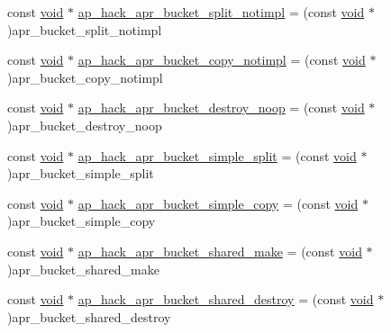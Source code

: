 \begin{DoxyCompactItemize}
\item 
const \hyperlink{group__MOD__ISAPI_gacd6cdbf73df3d9eed42fa493d9b621a6}{void} $\ast$ \hyperlink{srclib_2apr-util_2exports_8c_a0720184f0f26a370ccc67ec0debd404d}{ap\+\_\+hack\+\_\+apr\+\_\+bucket\+\_\+split\+\_\+notimpl} = (const \hyperlink{group__MOD__ISAPI_gacd6cdbf73df3d9eed42fa493d9b621a6}{void} $\ast$)apr\+\_\+bucket\+\_\+split\+\_\+notimpl
\item 
const \hyperlink{group__MOD__ISAPI_gacd6cdbf73df3d9eed42fa493d9b621a6}{void} $\ast$ \hyperlink{srclib_2apr-util_2exports_8c_a011320523c34b8503d2ecd620459f28f}{ap\+\_\+hack\+\_\+apr\+\_\+bucket\+\_\+copy\+\_\+notimpl} = (const \hyperlink{group__MOD__ISAPI_gacd6cdbf73df3d9eed42fa493d9b621a6}{void} $\ast$)apr\+\_\+bucket\+\_\+copy\+\_\+notimpl
\item 
const \hyperlink{group__MOD__ISAPI_gacd6cdbf73df3d9eed42fa493d9b621a6}{void} $\ast$ \hyperlink{srclib_2apr-util_2exports_8c_a2edb35fb5d92458acc813c2e5be75ef5}{ap\+\_\+hack\+\_\+apr\+\_\+bucket\+\_\+destroy\+\_\+noop} = (const \hyperlink{group__MOD__ISAPI_gacd6cdbf73df3d9eed42fa493d9b621a6}{void} $\ast$)apr\+\_\+bucket\+\_\+destroy\+\_\+noop
\item 
const \hyperlink{group__MOD__ISAPI_gacd6cdbf73df3d9eed42fa493d9b621a6}{void} $\ast$ \hyperlink{srclib_2apr-util_2exports_8c_a37e6e1bc7d9a2f51a62ca20568799fac}{ap\+\_\+hack\+\_\+apr\+\_\+bucket\+\_\+simple\+\_\+split} = (const \hyperlink{group__MOD__ISAPI_gacd6cdbf73df3d9eed42fa493d9b621a6}{void} $\ast$)apr\+\_\+bucket\+\_\+simple\+\_\+split
\item 
const \hyperlink{group__MOD__ISAPI_gacd6cdbf73df3d9eed42fa493d9b621a6}{void} $\ast$ \hyperlink{srclib_2apr-util_2exports_8c_a4f42d02bbc17b83f9d7657f1b35bc02a}{ap\+\_\+hack\+\_\+apr\+\_\+bucket\+\_\+simple\+\_\+copy} = (const \hyperlink{group__MOD__ISAPI_gacd6cdbf73df3d9eed42fa493d9b621a6}{void} $\ast$)apr\+\_\+bucket\+\_\+simple\+\_\+copy
\item 
const \hyperlink{group__MOD__ISAPI_gacd6cdbf73df3d9eed42fa493d9b621a6}{void} $\ast$ \hyperlink{srclib_2apr-util_2exports_8c_a965b3fcdb179fa9594cc51c4fce1140b}{ap\+\_\+hack\+\_\+apr\+\_\+bucket\+\_\+shared\+\_\+make} = (const \hyperlink{group__MOD__ISAPI_gacd6cdbf73df3d9eed42fa493d9b621a6}{void} $\ast$)apr\+\_\+bucket\+\_\+shared\+\_\+make
\item 
const \hyperlink{group__MOD__ISAPI_gacd6cdbf73df3d9eed42fa493d9b621a6}{void} $\ast$ \hyperlink{srclib_2apr-util_2exports_8c_aef49fb2e91937b01aa230a4b4e2b5e89}{ap\+\_\+hack\+\_\+apr\+\_\+bucket\+\_\+shared\+\_\+destroy} = (const \hyperlink{group__MOD__ISAPI_gacd6cdbf73df3d9eed42fa493d9b621a6}{void} $\ast$)apr\+\_\+bucket\+\_\+shared\+\_\+destroy

\end{DoxyCompactItemize}

